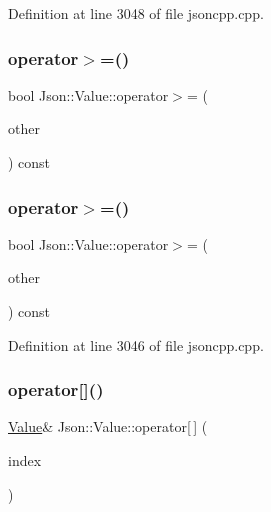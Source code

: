 Definition at line 3048 of file jsoncpp.\+cpp.

\hypertarget{class_json_1_1_value_afe2c3e52df60b9622cbd8358b74bdbf5}{}\label{class_json_1_1_value_afe2c3e52df60b9622cbd8358b74bdbf5} 
\subsubsection{\texorpdfstring{operator$>$=()}{operator>=()}\hspace{0.1cm}{\footnotesize\ttfamily [1/2]}}
{\footnotesize\ttfamily bool Json\+::\+Value\+::operator$>$= (\begin{DoxyParamCaption}\item[{const \hyperlink{class_json_1_1_value}{Value} \&}]{other }\end{DoxyParamCaption}) const}

\hypertarget{class_json_1_1_value_afe2c3e52df60b9622cbd8358b74bdbf5}{}\label{class_json_1_1_value_afe2c3e52df60b9622cbd8358b74bdbf5} 
\subsubsection{\texorpdfstring{operator$>$=()}{operator>=()}\hspace{0.1cm}{\footnotesize\ttfamily [2/2]}}
{\footnotesize\ttfamily bool Json\+::\+Value\+::operator$>$= (\begin{DoxyParamCaption}\item[{const \hyperlink{class_json_1_1_value}{Value} \&}]{other }\end{DoxyParamCaption}) const}



Definition at line 3046 of file jsoncpp.\+cpp.

\hypertarget{class_json_1_1_value_a9cca2c37d854443604b678f2236527ad}{}\label{class_json_1_1_value_a9cca2c37d854443604b678f2236527ad} 
\subsubsection{\texorpdfstring{operator[]()}{operator[]()}\hspace{0.1cm}{\footnotesize\ttfamily [1/18]}}
{\footnotesize\ttfamily \hyperlink{class_json_1_1_value}{Value}\& Json\+::\+Value\+::operator\mbox{[}$\,$\mbox{]} (\begin{DoxyParamCaption}\item[{\hyperlink{class_json_1_1_value_a184a91566cccca7b819240f0d5561c7d}{Array\+Index}}]{index }\end{DoxyParamCaption})}

